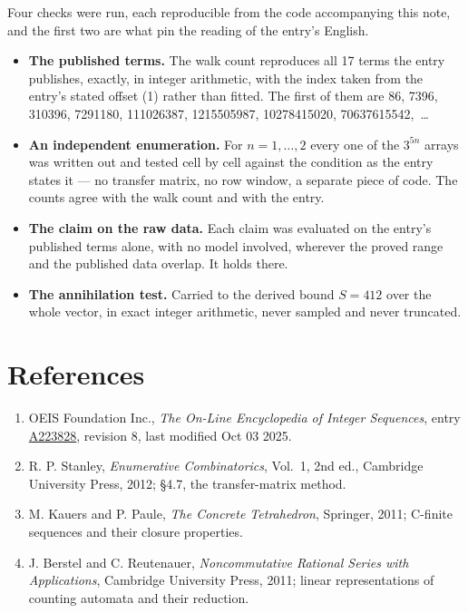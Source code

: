 \documentclass[11pt]{article}
\theoremstyle{definition}
\begin{document}
Four checks were run, each reproducible from the code accompanying this note, and the first two are what pin the reading of the entry's English.

\begin{itemize}

\item {\bfseries The published terms.} The walk count reproduces all 17 terms the entry publishes, exactly, in integer arithmetic, with the index taken from the entry's stated offset (1) rather than fitted. The first of them are 86, 7396, 310396, 7291180, 111026387, 1215505987, 10278415020, 70637615542,~\dots

\item {\bfseries An independent enumeration.} For $n = 1,\dots,2$ every one of the $3^{5n}$ arrays was written out and tested cell by cell against the condition as the entry states it --- no transfer matrix, no row window, a separate piece of code. The counts agree with the walk count and with the entry.

\item {\bfseries The claim on the raw data.} Each claim was evaluated on the entry's published terms alone, with no model involved, wherever the proved range and the published data overlap. It holds there.

\item {\bfseries The annihilation test.} Carried to the derived bound $S = 412$ over the whole vector, in exact integer arithmetic, never sampled and never truncated.

\end{itemize}

\section{References}

\begin{enumerate}

\item OEIS Foundation Inc., \emph{The On-Line Encyclopedia of Integer Sequences}, entry \href{https://oeis.org/A223828}{A223828}, revision 8, last modified Oct 03 2025.

\item R. P. Stanley, \emph{Enumerative Combinatorics}, Vol.~1, 2nd ed., Cambridge University Press, 2012; \S4.7, the transfer-matrix method.

\item M. Kauers and P. Paule, \emph{The Concrete Tetrahedron}, Springer, 2011; C-finite sequences and their closure properties.

\item J. Berstel and C. Reutenauer, \emph{Noncommutative Rational Series with Applications}, Cambridge University Press, 2011; linear representations of counting automata and their reduction.

\end{enumerate}
\end{document}
